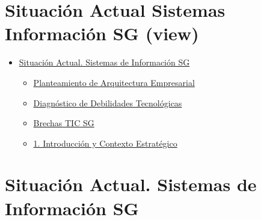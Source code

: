 \documentclass[
	a4paper, %
	12pt, %
]{include/CSSullivanBusinessReport}
\def\tightlist{}
\begin{document}
\newpage

\begin{twothirdswidth} %
	\tableofcontents %
\end{twothirdswidth}

\newpage


\section{Situación Actual Sistemas Información SG
(view)}\label{sec:situaciuxf3n-actual-sistemas-informaciuxf3n-sg-view}

\begin{itemize}
\tightlist
\item
  \hyperref[situaciuxf3n-actual.-sistemas-de-informaciuxf3n-sg]{Situación
  Actual. Sistemas de Información SG}

  \begin{itemize}
  \tightlist
  \item
    \hyperref[planteamiento-de-arquitectura-empresarial]{Planteamiento
    de Arquitectura Empresarial}
  \item
    \hyperref[diagnuxf3stico-de-debilidades-tecnoluxf3gicas]{Diagnóstico
    de Debilidades Tecnológicas}
  \item
    \hyperref[brechas-tic-sg]{Brechas TIC SG}
  \item
    \hyperref[1.-introducciuxf3n-y-contexto-estratuxe9gico]{1.
    Introducción y Contexto Estratégico}
  \end{itemize}
\end{itemize}

\newpage

\section{Situación Actual. Sistemas de Información
SG}\label{sec:situaciuxf3n-actual.-sistemas-de-informaciuxf3n-sg}
\end{document}
